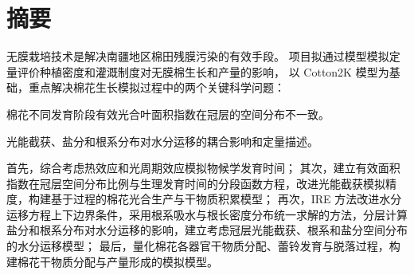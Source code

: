 \documentclass[a4paper,zihao=5,AutoFakeBold]{ctexbook}
\begin{document}

\chapter*{摘要}
无膜栽培技术是解决南疆地区棉田残膜污染的有效手段。
项目拟通过模型模拟定量评价种植密度和灌溉制度对无膜棉生长和产量的影响，
以 Cotton2K 模型为基础，重点解决棉花生长模拟过程中的两个关键科学问题：
\begin{enumerate*}
    \item 棉花不同发育阶段有效光合叶面积指数在冠层的空间分布不一致。
    \item 光能截获、盐分和根系分布对水分运移的耦合影响和定量描述。
\end{enumerate*}
首先，综合考虑热效应和光周期效应模拟物候学发育时间；
其次，建立有效面积指数在冠层空间分布比例与生理发育时间的分段函数方程，改进光能截获模拟精度，构建基于过程的棉花光合生产与干物质积累模型；
再次，IRE 方法改进水分运移方程上下边界条件，采用根系吸水与根长密度分布统一求解的方法，分层计算盐分和根系分布对水分运移的影响，建立考虑冠层光能截获、根系和盐分空间分布的水分运移模型；
最后，量化棉花各器官干物质分配、蕾铃发育与脱落过程，构建棉花干物质分配与产量形成的模拟模型。

\printbibliography
\end{document}
